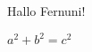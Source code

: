 \documentclass[12pt,ngerman]{scrartcl}
\begin{document}
Hallo Fernuni! \blindtext[2]

\(a^2+b^2=c^2 \)

\blindtext[2]
\end{document}
